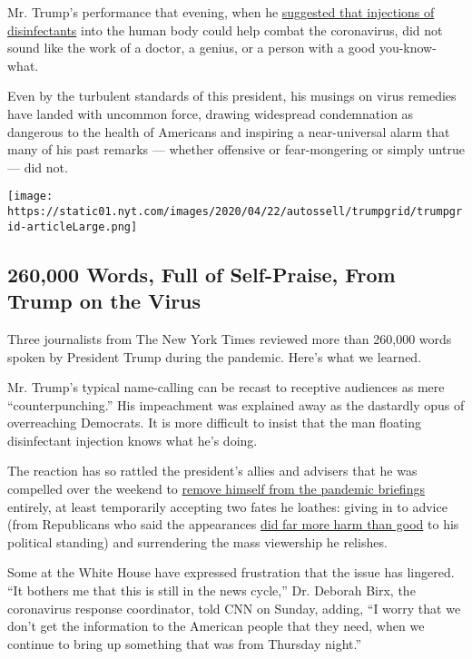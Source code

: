 Mr. Trump's performance that evening, when he
\href{https://www.nytimes.com/2020/04/24/us/politics/trump-inject-disinfectant-bleach-coronavirus.html}{suggested
that injections of disinfectants} into the human body could help combat
the coronavirus, did not sound like the work of a doctor, a genius, or a
person with a good you-know-what.

Even by the turbulent standards of this president, his musings on virus
remedies have landed with uncommon force, drawing widespread
condemnation as dangerous to the health of Americans and inspiring a
near-universal alarm that many of his past remarks --- whether offensive
or fear-mongering or simply untrue --- did not.

\href{https://www.nytimes.com/interactive/2020/04/26/us/politics/trump-coronavirus-briefings-analyzed.html}{}

\texttt{[image: https://static01.nyt.com/images/2020/04/22/autossell/trumpgrid/trumpgrid-articleLarge.png]}

\hypertarget{260000-words-full-of-self-praise-from-trump-on-the-virus}{%
\subsection{260,000 Words, Full of Self-Praise, From Trump on the
Virus}\label{260000-words-full-of-self-praise-from-trump-on-the-virus}}

Three journalists from The New York Times reviewed more than 260,000
words spoken by President Trump during the pandemic. Here's what we
learned.

Mr. Trump's typical name-calling can be recast to receptive audiences as
mere ``counterpunching.'' His impeachment was explained away as the
dastardly opus of overreaching Democrats. It is more difficult to insist
that the man floating disinfectant injection knows what he's doing.

The reaction has so rattled the president's allies and advisers that he
was compelled over the weekend to
\href{https://www.nytimes.com/2020/04/25/us/coronavirus-news.html}{remove
himself from the pandemic briefings} entirely, at least temporarily
accepting two fates he loathes: giving in to advice (from Republicans
who said the appearances
\href{https://www.nytimes.com/2020/04/25/us/politics/trump-election-briefings.html}{did
far more harm than good} to his political standing) and surrendering the
mass viewership he relishes.

Some at the White House have expressed frustration that the issue has
lingered. ``It bothers me that this is still in the news cycle,'' Dr.
Deborah Birx, the coronavirus response coordinator, told CNN on Sunday,
adding, ``I worry that we don't get the information to the American
people that they need, when we continue to bring up something that was
from Thursday night.''

